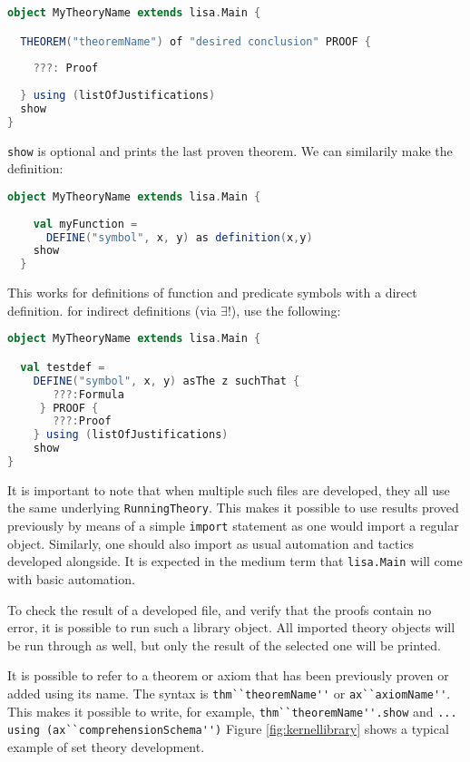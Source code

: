 \begin{lstlisting}[language=Scala, frame=single]
object MyTheoryName extends lisa.Main {

  THEOREM("theoremName") of "desired conclusion" PROOF {
    
    ???: Proof
    
  } using (listOfJustifications)
  show
}
\end{lstlisting}
\lstinline{show}{} is optional and prints the last proven theorem. We can similarily make the definition:

\noindent
\begin{minipage}{\textwidth}
  \begin{lstlisting}[language=Scala, frame=single]
  object MyTheoryName extends lisa.Main {
  
    val myFunction = 
      DEFINE("symbol", x, y) as definition(x,y)
    show
  }
  \end{lstlisting}
\end{minipage}
%
This works for definitions of function and predicate symbols with a direct definition. for indirect definitions (via $\exists !$), use the following:
%
\begin{lstlisting}[language=Scala, frame=single]
object MyTheoryName extends lisa.Main {

  val testdef =
    DEFINE("symbol", x, y) asThe z suchThat {
       ???:Formula
     } PROOF {
       ???:Proof
    } using (listOfJustifications)
    show
}
\end{lstlisting}

It is important to note that when multiple such files are developed, they all use the same underlying \lstinline{RunningTheory}{}. This makes it possible to use results proved previously by means of a simple \lstinline{import}{} statement as one would import a regular object. Similarly, one should also import as usual automation and tactics developed alongside. It is expected in the medium term that \lstinline{lisa.Main} will come with basic automation.

To check the result of a developed file, and verify that the proofs contain no error, it is possible to run such a library object. 
All imported theory objects will be run through as well, but only the result of the selected one will be printed. 

It is possible to refer to a theorem or axiom that has been previously proven or added using its name. The syntax is \lstinline{thm``theoremName''}{} or \lstinline{ax``axiomName''}{}. This makes it possible to write, for example, \lstinline{thm``theoremName''.show}{} and \lstinline{... using (ax``comprehensionSchema'')} Figure \ref{fig:kernellibrary} shows a typical example of set theory development.


